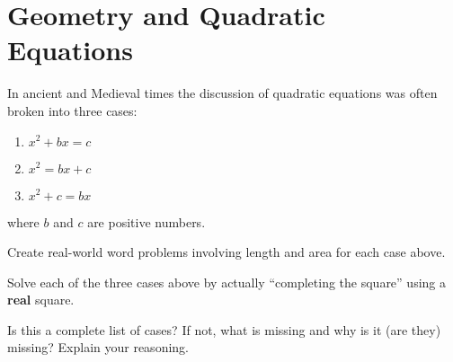 \newpage
\section{Geometry and Quadratic Equations}	



In ancient and Medieval times the discussion of quadratic equations
was often broken into three cases:
\begin{enumerate}
\item $x^2 + bx = c$
\item $x^2 = bx + c$
\item $x^2 + c = bx$
\end{enumerate}
where $b$ and $c$ are positive numbers. 


\begin{prob}
Create real-world word problems involving length and area for each
case above.
\end{prob}

\begin{prob}
Solve each of the three cases above by actually ``completing the
square'' using a \textbf{real} square.
\end{prob}

\begin{prob}
Is this a complete list of cases? If not, what is missing and why is
it (are they) missing? Explain your reasoning.
\end{prob}



